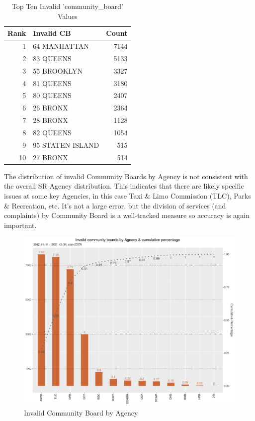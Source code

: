 \documentclass[12pt, titlepage]{article}
\begin{document}
{		\begin{table}[H]
		\centering
		\footnotesize
		\begin{tabular}{rlr}
		\toprule
		\textbf{Rank} & \textbf{Invalid CB} & \textbf{Count} \\
			\midrule
				1 & 64 MANHATTAN & 7144 \\
				2 & 83 QUEENS & 5133 \\
				3 & 55 BROOKLYN & 3327 \\
				4 & 81 QUEENS & 3180 \\
				5 & 80 QUEENS & 2407 \\
				6 & 26 BRONX & 2364 \\
				7 & 28 BRONX & 1128 \\
				8 & 82 QUEENS & 1054 \\
				9 & 95 STATEN ISLAND & 515 \\
				10 & 27 BRONX & 514 \\
			\bottomrule
		\end{tabular}
		\caption{Top Ten Invalid 'community\_board' Values}
		\end{table}
		
		The distribution of invalid Community Boards by Agency is not consistent with the overall SR Agency distribution. This indicates that there are likely
		specific issues at some key Agencies, in this case Taxi \& Limo Commission (TLC), Parks \& Recreation, etc. It's not a large error, but the division of services
		(and complaints) by Community Board is a well-tracked measure so accuracy is again important.

		\begin{figure}[H]
	 	 \centering
		  \includegraphics[width = \textwidth]{invalid_community_boards.pdf}
		  \caption{Invalid Community Board by Agency}
		  \label{fig:invalid_community_boards}
		\end{figure}


}
\end{document}
